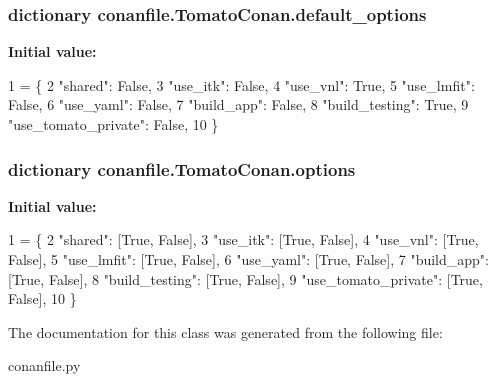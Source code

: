 \subsubsection[{\texorpdfstring{default\+\_\+options}{default_options}}]{\setlength{\rightskip}{0pt plus 5cm}dictionary conanfile.\+Tomato\+Conan.\+default\+\_\+options\hspace{0.3cm}{\ttfamily [static]}}\hypertarget{classconanfile_1_1_tomato_conan_a29503a3b385bfdc7deb5dc266624b630}{}\label{classconanfile_1_1_tomato_conan_a29503a3b385bfdc7deb5dc266624b630}
{\bfseries Initial value\+:}
\begin{DoxyCode}
1 = \{
2         \textcolor{stringliteral}{"shared"}: \textcolor{keyword}{False},
3         \textcolor{stringliteral}{"use\_itk"}: \textcolor{keyword}{False},
4         \textcolor{stringliteral}{"use\_vnl"}: \textcolor{keyword}{True},
5         \textcolor{stringliteral}{"use\_lmfit"}: \textcolor{keyword}{False},
6         \textcolor{stringliteral}{"use\_yaml"}: \textcolor{keyword}{False},
7         \textcolor{stringliteral}{"build\_app"}: \textcolor{keyword}{False},
8         \textcolor{stringliteral}{"build\_testing"}: \textcolor{keyword}{True},
9         \textcolor{stringliteral}{"use\_tomato\_private"}: \textcolor{keyword}{False},
10     \}
\end{DoxyCode}
\subsubsection[{\texorpdfstring{options}{options}}]{\setlength{\rightskip}{0pt plus 5cm}dictionary conanfile.\+Tomato\+Conan.\+options\hspace{0.3cm}{\ttfamily [static]}}\hypertarget{classconanfile_1_1_tomato_conan_adcb0f901242c4b6bf4bc216596cb077d}{}\label{classconanfile_1_1_tomato_conan_adcb0f901242c4b6bf4bc216596cb077d}
{\bfseries Initial value\+:}
\begin{DoxyCode}
1 = \{
2         \textcolor{stringliteral}{"shared"}: [\textcolor{keyword}{True}, \textcolor{keyword}{False}],
3         \textcolor{stringliteral}{"use\_itk"}: [\textcolor{keyword}{True}, \textcolor{keyword}{False}],
4         \textcolor{stringliteral}{"use\_vnl"}: [\textcolor{keyword}{True}, \textcolor{keyword}{False}],
5         \textcolor{stringliteral}{"use\_lmfit"}: [\textcolor{keyword}{True}, \textcolor{keyword}{False}],
6         \textcolor{stringliteral}{"use\_yaml"}: [\textcolor{keyword}{True}, \textcolor{keyword}{False}],
7         \textcolor{stringliteral}{"build\_app"}: [\textcolor{keyword}{True}, \textcolor{keyword}{False}],
8         \textcolor{stringliteral}{"build\_testing"}: [\textcolor{keyword}{True}, \textcolor{keyword}{False}],
9         \textcolor{stringliteral}{"use\_tomato\_private"}: [\textcolor{keyword}{True}, \textcolor{keyword}{False}],
10     \}
\end{DoxyCode}


The documentation for this class was generated from the following file\+:\begin{DoxyCompactItemize}
\item 
conanfile.\+py\end{DoxyCompactItemize}
